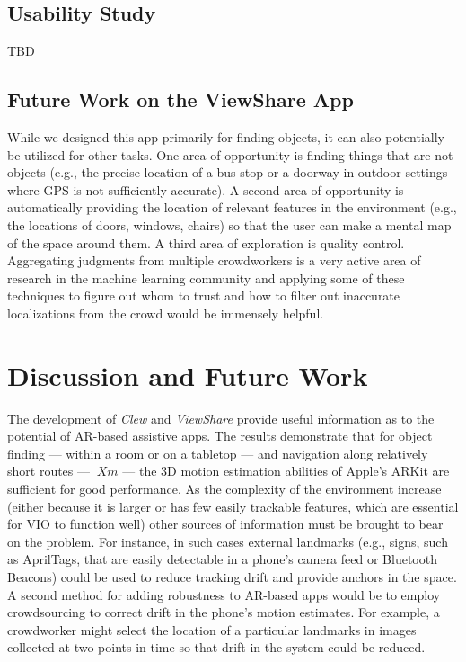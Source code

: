 \documentclass[chi_draft]{sigchi}
\begin{document}
\subsection{Usability Study}
TBD

\subsection{Future Work on the ViewShare App}
While we designed this app primarily for finding objects, it can also potentially be utilized for other tasks.  One area of opportunity is finding things that are not objects (e.g., the precise location of a bus stop or a doorway in outdoor settings where GPS is not sufficiently accurate).  A second area of opportunity is automatically providing the location of relevant features in the environment (e.g., the locations of doors, windows, chairs) so that the user can make a mental map of the space around them.  A third area of exploration is quality control.  Aggregating judgments from multiple crowdworkers is a very active area of research in the machine learning community and applying some of these techniques to figure out whom to trust and how to filter out inaccurate localizations from the crowd would be immensely helpful.

\section{Discussion and Future Work}

The development of \emph{Clew} and \emph{ViewShare} provide useful information as to the potential of AR-based assistive apps.  The results demonstrate that for object finding --- within a room or on a tabletop --- and navigation along relatively short routes --- $~Xm$ --- the 3D motion estimation abilities of Apple's ARKit are sufficient for good performance.  As the complexity of the environment increase (either because it is larger or has few easily trackable features, which are essential for VIO to function well) other sources of information must be brought to bear on the problem.  For instance, in such cases external landmarks (e.g., signs, such as AprilTags, that are easily detectable in a phone's camera feed or Bluetooth Beacons) could be used to reduce tracking drift and provide anchors in the space.  A second method for adding robustness to AR-based apps would be to employ crowdsourcing to correct drift in the phone's motion estimates.  For example, a crowdworker might select the location of a particular  landmarks in images collected at two points in time so that drift in the system could be reduced.
\end{document}
